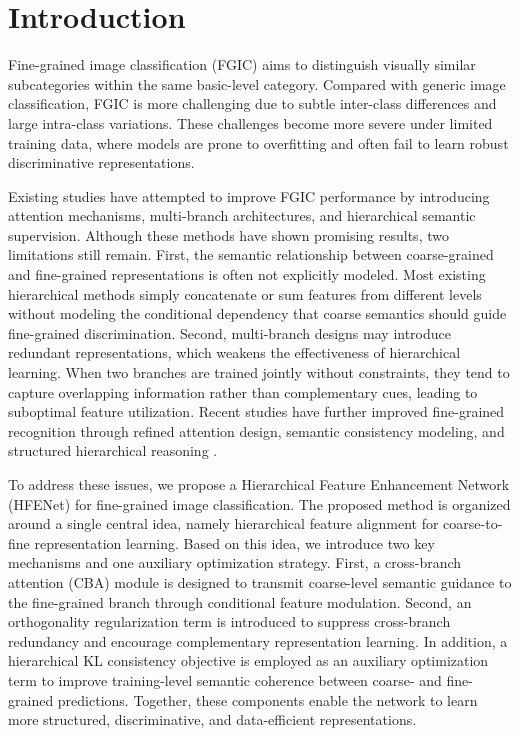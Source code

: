 \documentclass[pdflatex,sn-mathphys-num]{sn-jnl}
\theoremstyle{thmstyleone}%
\theoremstyle{thmstyletwo}%
\theoremstyle{thmstylethree}%
\begin{document}
\maketitle

\section{Introduction}
\label{sec:introduction}

Fine-grained image classification (FGIC) aims to distinguish visually similar subcategories within the same basic-level category. 
Compared with generic image classification, FGIC is more challenging due to subtle inter-class differences and large intra-class variations. 
These challenges become more severe under limited training data, where models are prone to overfitting and often fail to learn robust discriminative representations.

Existing studies have attempted to improve FGIC performance by introducing attention mechanisms, multi-branch architectures, and hierarchical semantic supervision. 
Although these methods have shown promising results, two limitations still remain. 
First, the semantic relationship between coarse-grained and fine-grained representations is often not explicitly modeled. 
Most existing hierarchical methods simply concatenate or sum features from different levels without modeling the conditional dependency that coarse semantics should guide fine-grained discrimination. 
Second, multi-branch designs may introduce redundant representations, which weakens the effectiveness of hierarchical learning. 
When two branches are trained jointly without constraints, they tend to capture overlapping information rather than complementary cues, leading to suboptimal feature utilization.
Recent studies have further improved fine-grained recognition through refined attention design, semantic consistency modeling, and structured hierarchical reasoning \cite{wang2025crasmra,wang2025cfgvc,gao2025chbc}.

To address these issues, we propose a Hierarchical Feature Enhancement Network (HFENet) for fine-grained image classification. 
The proposed method is organized around a single central idea, namely hierarchical feature alignment for coarse-to-fine representation learning. 
Based on this idea, we introduce two key mechanisms and one auxiliary optimization strategy. 
First, a cross-branch attention (CBA) module is designed to transmit coarse-level semantic guidance to the fine-grained branch through conditional feature modulation. 
Second, an orthogonality regularization term is introduced to suppress cross-branch redundancy and encourage complementary representation learning. 
In addition, a hierarchical KL consistency objective is employed as an auxiliary optimization term to improve training-level semantic coherence between coarse- and fine-grained predictions. 
Together, these components enable the network to learn more structured, discriminative, and data-efficient representations.
\end{document}
